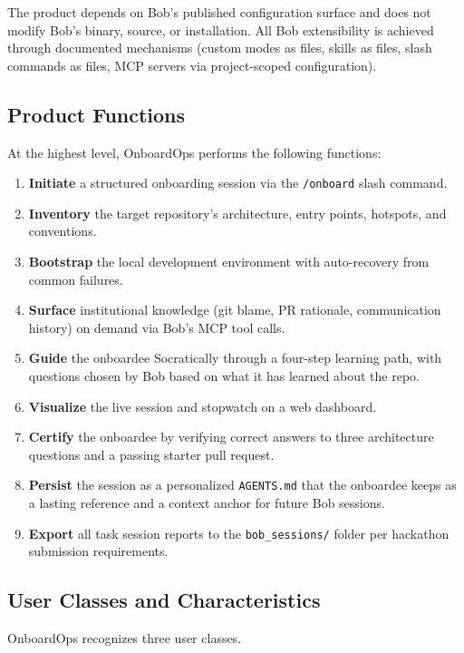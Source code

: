 \documentclass[11pt,letterpaper]{article}
\begin{document}
The product depends on Bob's published configuration surface and does not modify Bob's binary, source, or installation. All Bob extensibility is achieved through documented mechanisms (custom modes as files, skills as files, slash commands as files, MCP servers via project-scoped configuration).

\subsection{Product Functions}

At the highest level, OnboardOps performs the following functions:

\begin{enumerate}
  \item \textbf{Initiate} a structured onboarding session via the \texttt{/onboard} slash command.
  \item \textbf{Inventory} the target repository's architecture, entry points, hotspots, and conventions.
  \item \textbf{Bootstrap} the local development environment with auto-recovery from common failures.
  \item \textbf{Surface} institutional knowledge (git blame, PR rationale, communication history) on demand via Bob's MCP tool calls.
  \item \textbf{Guide} the onboardee Socratically through a four-step learning path, with questions chosen by Bob based on what it has learned about the repo.
  \item \textbf{Visualize} the live session and stopwatch on a web dashboard.
  \item \textbf{Certify} the onboardee by verifying correct answers to three architecture questions and a passing starter pull request.
  \item \textbf{Persist} the session as a personalized \texttt{AGENTS.md} that the onboardee keeps as a lasting reference and a context anchor for future Bob sessions.
  \item \textbf{Export} all task session reports to the \texttt{bob\_sessions/} folder per hackathon submission requirements.
\end{enumerate}

\subsection{User Classes and Characteristics}

OnboardOps recognizes three user classes.
\end{document}
